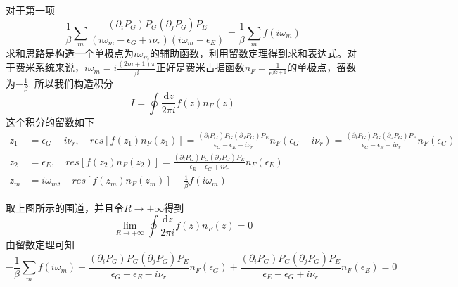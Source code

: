 \documentclass{article}
\numberwithin{equation}{subsection}
\begin{document}
对于第一项
\begin{equation}
    \frac{1}{\beta}\sum_{m}\frac{(\partial_i P_G)P_G(\partial_j P_G)P_E}{(i\omega_m-\epsilon_G+i\nu_r)(i\omega_m-\epsilon_E)}=\frac{1}{\beta}\sum_{m}f(i\omega_m)
\end{equation}
求和思路是构造一个单极点为$i\omega_m$的辅助函数，利用留数定理得到求和表达式。对于费米系统来说，$i\omega_m=i\frac{(2m+1)\pi}{\beta}$正好是费米占据函数$n_F=\frac{1}{e^{\beta z+1}}$的单极点，留数为$-\frac{1}{\beta}$. 所以我们构造积分
\begin{equation}
    I=\oint\frac{\mathrm{d}z}{2\pi i}f(z)n_F(z)
\end{equation}
这个积分的留数如下
\begin{equation}
    \begin{split}
        z_1&=\epsilon_G-i\nu_r,\quad res[f(z_1)n_F(z_1)]=\frac{(\partial_iP_G)P_G(\partial_JP_G)P_E}{\epsilon_G-\epsilon_E-i\nu_r}n_F(\epsilon_G-i\nu_r)=\frac{(\partial_iP_G)P_G(\partial_JP_G)P_E}{\epsilon_G-\epsilon_E-i\nu_r}n_F(\epsilon_G)\\
        z_2&=\epsilon_E,\quad res[f(z_2)n_F(z_2)]=\frac{(\partial_iP_G)P_G(\partial_JP_G)P_E}{\epsilon_E-\epsilon_G+i\nu_r}n_F(\epsilon_E)\\
        z_m&=i\omega_m,\quad res[f(z_m)n_F(z_m)]-\frac{1}{\beta}f(i\omega_m)
    \end{split}
\end{equation}
\begin{center}
\end{center}
取上图所示的围道，并且令$R\to+\infty$得到
\begin{equation}
    \lim_{R\to+\infty}\oint\frac{\mathrm{d}z}{2\pi i}f(z)n_F(z)=0
\end{equation}
由留数定理可知
\begin{equation}
    -\frac{1}{\beta}\sum_mf(i\omega_m)+\frac{(\partial_iP_G)P_G(\partial_jP_G)P_E}{\epsilon_G-\epsilon_E-i\nu_r}n_F(\epsilon_G)+\frac{(\partial_iP_G)P_G(\partial_jP_G)P_E}{\epsilon_E-\epsilon_G+i\nu_r}n_F(\epsilon_E)=0
\end{equation}
\end{document}
